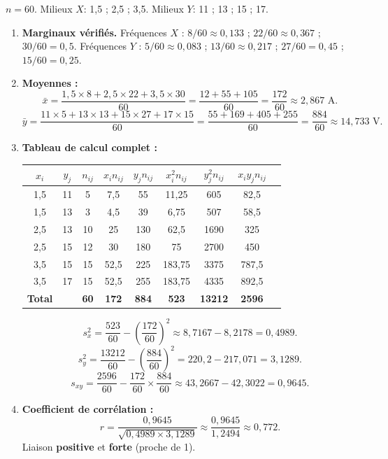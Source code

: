 \documentclass[11pt]{article}
\begin{document}
\begin{corrige}
$n=60$. Milieux $X$: 1,5 ; 2,5 ; 3,5. Milieux $Y$: 11 ; 13 ; 15 ; 17.

\begin{enumerate}
\item \textbf{Marginaux vérifiés.} Fréquences $X$ : $8/60 \approx 0,133$ ; $22/60 \approx 0,367$ ; $30/60 = 0,5$.
Fréquences $Y$ : $5/60 \approx 0,083$ ; $13/60 \approx 0,217$ ; $27/60 = 0,45$ ; $15/60 = 0,25$.

\item \textbf{Moyennes :}
\[
\bar{x} = \frac{1,5\times8 + 2,5\times22 + 3,5\times30}{60} = \frac{12 + 55 + 105}{60} = \frac{172}{60} \approx 2,867 \text{ A}.
\]
\[
\bar{y} = \frac{11\times5 + 13\times13 + 15\times27 + 17\times15}{60} = \frac{55 + 169 + 405 + 255}{60} = \frac{884}{60} \approx 14,733 \text{ V}.
\]

\item \textbf{Tableau de calcul complet :}
\begin{center}
\begin{tabular}{|c|c|c|c|c|c|c|c|c|}\hline
$x_i$ & $y_j$ & $n_{ij}$ & $x_i n_{ij}$ & $y_j n_{ij}$ & $x_i^2 n_{ij}$ & $y_j^2 n_{ij}$ & $x_i y_j n_{ij}$ \\ \hline
1,5 & 11 & 5 & 7,5 & 55 & 11,25 & 605 & 82,5 \\
1,5 & 13 & 3 & 4,5 & 39 & 6,75 & 507 & 58,5 \\
2,5 & 13 & 10 & 25 & 130 & 62,5 & 1690 & 325 \\
2,5 & 15 & 12 & 30 & 180 & 75 & 2700 & 450 \\
3,5 & 15 & 15 & 52,5 & 225 & 183,75 & 3375 & 787,5 \\
3,5 & 17 & 15 & 52,5 & 255 & 183,75 & 4335 & 892,5 \\ \hline
\textbf{Total} & & \textbf{60} & \textbf{172} & \textbf{884} & \textbf{523} & \textbf{13212} & \textbf{2596} \\ \hline
\end{tabular}
\end{center}

\[
s_x^2 = \frac{523}{60} - \left(\frac{172}{60}\right)^2 \approx 8,7167 - 8,2178 = 0,4989.
\]
\[
s_y^2 = \frac{13212}{60} - \left(\frac{884}{60}\right)^2 = 220,2 - 217,071 = 3,1289.
\]
\[
s_{xy} = \frac{2596}{60} - \frac{172}{60}\times\frac{884}{60} \approx 43,2667 - 42,3022 = 0,9645.
\]

\item \textbf{Coefficient de corrélation :}
\[
r = \frac{0,9645}{\sqrt{0,4989 \times 3,1289}} \approx \frac{0,9645}{1,2494} \approx \boxed{0,772}.
\]
Liaison \textbf{positive} et \textbf{forte} (proche de 1).


\end{enumerate}
\end{corrige}
\end{document}

